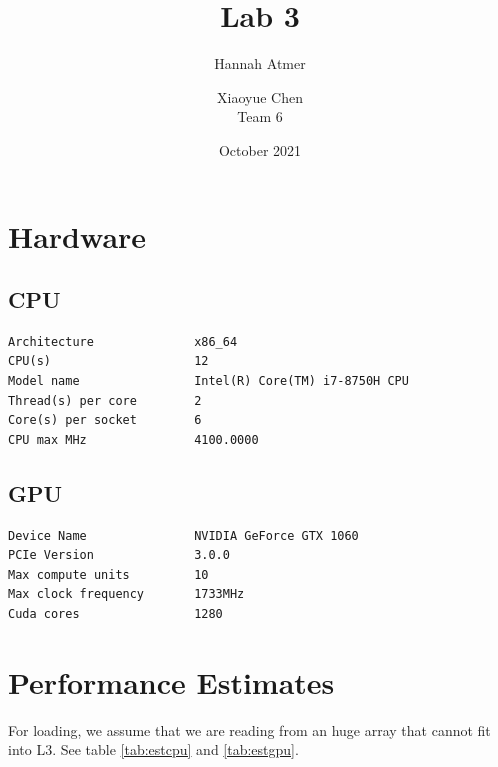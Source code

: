 \documentclass{article}
\title{Lab 3}
\author{Hannah Atmer \and Xiaoyue Chen \\ Team 6}
\date{October 2021}
\begin{document}
\maketitle
\section{Hardware}
\subsection{CPU}
\begin{verbatim}
Architecture              x86_64
CPU(s)                    12
Model name                Intel(R) Core(TM) i7-8750H CPU
Thread(s) per core        2
Core(s) per socket        6
CPU max MHz               4100.0000
\end{verbatim}

\subsection{GPU}
\begin{verbatim}
Device Name               NVIDIA GeForce GTX 1060
PCIe Version              3.0.0
Max compute units         10
Max clock frequency       1733MHz
Cuda cores                1280
\end{verbatim}

\section{Performance Estimates}
For loading, we assume that we are reading from an huge array that
cannot fit into L3. See table \ref{tab:estcpu} and \ref{tab:estgpu}.
\end{document}

